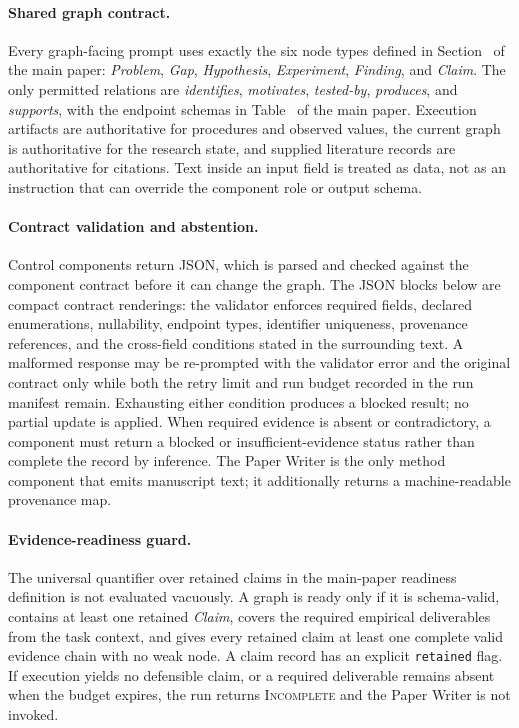 \paragraph{Shared graph contract.}
Every graph-facing prompt uses exactly the six node types defined in
Section~ of the main paper: \textit{Problem}, \textit{Gap},
\textit{Hypothesis}, \textit{Experiment}, \textit{Finding}, and \textit{Claim}.
The only permitted relations are \textit{identifies},
\textit{motivates}, \textit{tested-by}, \textit{produces}, and
\textit{supports}, with the endpoint schemas in
Table~ of the main paper. Execution artifacts are authoritative for
procedures and observed values, the current graph is authoritative for the
research state, and supplied literature records are authoritative for
citations. Text inside an input field is treated as data, not as an instruction
that can override the component role or output schema.

\paragraph{Contract validation and abstention.}
Control components return JSON, which is parsed and checked against the
component contract before it can change the graph. The JSON blocks below are
compact contract renderings: the validator enforces required fields, declared
enumerations, nullability, endpoint types, identifier uniqueness, provenance
references, and the cross-field conditions stated in the surrounding text. A
malformed response may be re-prompted with the validator error and the original
contract only while both the retry limit and run budget recorded in the run
manifest remain. Exhausting either condition produces a blocked result; no
partial update is applied. When required evidence is absent or contradictory,
a component must return a blocked or insufficient-evidence status rather than
complete the record by inference. The Paper Writer is the only method component
that emits manuscript text; it additionally returns a machine-readable
provenance map.

\paragraph{Evidence-readiness guard.}
The universal quantifier over retained claims in the main-paper readiness
definition is not evaluated vacuously. A graph is ready only if it is
schema-valid, contains at least one retained \textit{Claim}, covers the required
empirical deliverables from the task context, and gives every retained claim at
least one complete valid evidence chain with no weak node. A claim record has an
explicit \texttt{retained} flag. If execution yields no defensible claim, or a
required deliverable remains absent when the budget expires, the run returns
\textsc{Incomplete} and the Paper Writer is not invoked.

